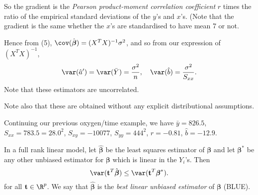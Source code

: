 \documentclass[a4paper]{article}
\begin{document}
So the gradient is the \emph{Pearson product-moment correlation coefficient} $r$ times the ratio of the empirical standard deviations of the $y$'s and $x$'s. (Note that the gradient is the same whether the $x$'s are standardised to have mean 7 or not.

Hence from (5),  $\cov(\hat{\boldsymbol\beta}) = (X^TX)^{-1}\sigma^2$, and so from our expression of $(X^TX)^{-1}$,
\[
  \var(\hat{a}') = \var (\bar Y) = \frac{\sigma^2}{n}, \quad\var(\hat{b}) = \frac{\sigma^2}{S_{xx}}.
\]
Note that these estimators are uncorrelated.

Note also that these are obtained without any explicit distributional assumptions.

\begin{eg}
  Continuing our previous oxygen/time example, we have $\bar y = 826.5$, $S_{xx} = 783.5 = 28.0^2$, $S_{xy} = -10077$, $S_{yy} = 444^2$, $r = -0.81$, $\hat b = -12.9$.
\end{eg}

\begin{thm}
  In a full rank linear model, let $\hat{\boldsymbol\beta}$ be the least squares estimator of $\boldsymbol\beta$ and let $\boldsymbol\beta^*$ be any other unbiased estimator for $\boldsymbol\beta$ which is linear in the $Y_i$'s. Then
  \[
    \var(\mathbf{t}^T\hat{\boldsymbol\beta}) \leq \var (\mathbf{t}^T\boldsymbol\beta^*).
  \]
  for all $\mathbf{t}\in \R^p$. We say that $\hat{\boldsymbol\beta}$ is the \emph{best linear unbiased estimator} of $\boldsymbol\beta$ (BLUE).
\end{thm}
\end{document}
